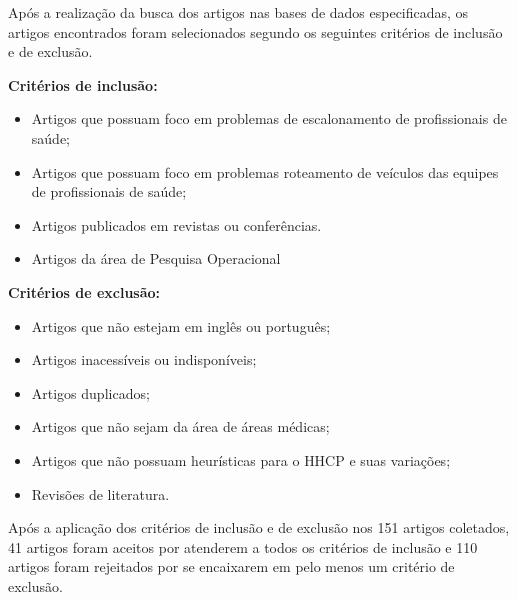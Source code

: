 
Após a realização da busca dos artigos nas bases de dados especificadas, os artigos encontrados foram selecionados segundo os seguintes critérios de inclusão e de exclusão.

\textbf{Critérios de inclusão:}
\begin{itemize}
\item Artigos que possuam foco em problemas de escalonamento de profissionais de saúde;
\item Artigos que possuam foco em problemas roteamento de veículos das equipes de profissionais de saúde;
\item Artigos publicados em revistas ou conferências.
\item Artigos da área de Pesquisa Operacional
\end{itemize}

\textbf{Critérios de exclusão:}
\begin{itemize}
\item Artigos que não estejam em inglês ou português;
\item Artigos inacessíveis ou indisponíveis;
\item Artigos duplicados;
\item Artigos que não sejam da área de áreas médicas;
\item Artigos que não possuam heurísticas para o \ac{HHCP} e suas variações;
\item Revisões de literatura.
\end{itemize}

Após a aplicação dos critérios de inclusão e de exclusão nos 151 artigos coletados, 41 artigos foram aceitos por atenderem a todos os critérios de inclusão e 110 artigos foram rejeitados por se encaixarem em pelo menos um critério de exclusão. %


